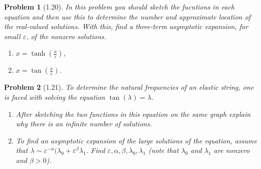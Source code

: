 \documentclass[11pt]{article}
\theoremstyle{problemstyle}
\newtheorem{problem}{Problem}
\begin{document}
\begin{problem}[1.20]
  In this problem you should sketch the fucntions in each equation and then use this to determine
  the number and approximate location of the real-valued solutions. With this, find a three-term
  asymptotic expansion, for small $\varepsilon$, of the nonzero solutions.
  \begin{enumerate}
    \item $x = \tanh \left(\frac{x}{\varepsilon}\right)$,
    \item $x = \tan\left(\frac{x}{\varepsilon}\right)$.
  \end{enumerate}
\end{problem}

\begin{problem}[1.21]
  To determine the natural frequencies of an elastic string, one is faced with solving the equation
  $\tan(\lambda) = \lambda$.
  \begin{enumerate}
    \item After sketching the two functions in this equation on the same graph explain why there is
      an infinite number of solutions.
    \item To find an asymptotic expansion of the large solutions of the equation, assume that
      $\lambda \sim \varepsilon^{-\alpha}(\lambda_0 + \varepsilon^\beta\lambda_1$. Find
      $\varepsilon, \alpha, \beta, \lambda_0, \lambda_1$ (note that $\lambda_0$ and $\lambda_1$ are
      nonzero and $\beta > 0$).
  \end{enumerate}
\end{problem}
\end{document}
